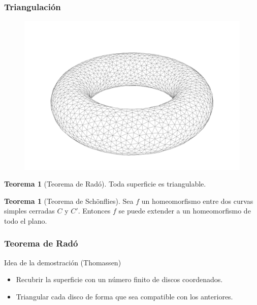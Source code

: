 \documentclass{beamer}
\theoremstyle{definition}
\newtheorem{tma}[defin]{Teorema}
\begin{document}
\begin{frame}
\frametitle{Triangulación}

\begin{figure}
\includegraphics[scale=0.07]{./images/triangulacion.png}
\end{figure}

\begin{tma}[Teorema de Radó]
Toda superficie es triangulable.
\end{tma}

\begin{tma}[Teorema de Schönflies]
Sea $f$ un homeomorfismo entre dos curvas simples cerradas $C$ y $C'$. Entonces $f$ se puede extender a un homeomorfismo de todo el plano.
\end{tma}
\end{frame}

\begin{frame}
\frametitle{Teorema de Radó}
Idea de la demostración (Thomassen)
\begin{itemize}
\item Recubrir la superficie con un número finito de discos coordenados.
\item Triangular cada disco de forma que sea compatible con los anteriores.
\end{itemize}
\end{frame}
\end{document}
